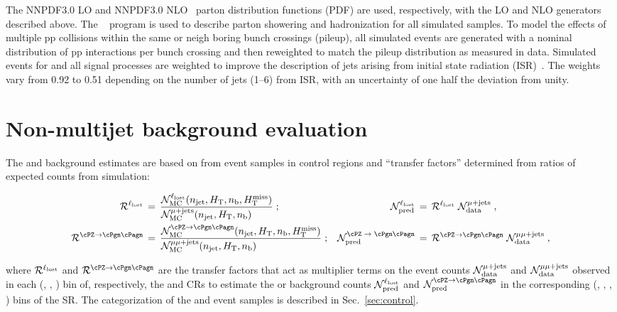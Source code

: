 The \textsc{NNPDF}3.0 LO and \textsc{NNPDF}3.0 NLO~\cite{nnpdf} parton
distribution functions (PDF) are used, respectively, with the LO and
NLO generators described above. The ~\cite{pythia} program
is used to describe parton showering and hadronization for all
simulated samples. To model the effects of multiple pp collisions
within the same or neigh boring bunch crossings (pileup), all
simulated events are generated with a nominal distribution of pp
interactions per bunch crossing and then reweighted to match the
pileup distribution as measured in data. Simulated events for \ttbar
and all signal processes are weighted to improve the description of
jets arising from initial state radiation
(ISR)~\cite{single-lepton-stop}. The weights vary from 0.92 to 0.51 
depending on the number of jets (1--6) from ISR, with an uncertainty
of one half the deviation from unity. 


\section{Non-multijet background evaluation}
\label{sec:ewk}

The \lost and \znunuj background estimates are based on from event
samples in control regions and ``transfer factors'' determined from
ratios of expected counts from simulation:

\begin{align}
  \tf^{\lost} \, & = \,
  \frac{\mathcal{N}^{\lost}_\textrm{MC}(\njet, \scalht, \nb, \mht)}
  {\mathcal{N}^{\mj}_\textrm{MC}(\njet, \scalht, \nb)\hfill} \; ;
  & 
  \mathcal{N}^{\lost}_\textrm{pred} \, & = \,
  \tf^{\lost} \; \mathcal{N}^{\mj}_\textrm{data} \; ,
  \\
  \tf^{\znunu} \, & = \,
  \frac{\mathcal{N}^{\znunu}_\textrm{MC}(\njet, \scalht, \nb, \mht)}
  {\mathcal{N}^{\mmj}_\textrm{MC}(\njet, \scalht, \nb)\hfill} \; ;
  & 
  \mathcal{N}^\textrm{\znunu}_\textrm{pred} \, & = \,
  \tf^{\znunu} \; \mathcal{N}^{\mmj}_\textrm{data} \; ,
\end{align}

where $\mathcal{R}^{\ell_\textrm{lost}}$ and $\tf^{\znunu}$ are the transfer factors that
act as multiplier terms on the event counts
$\mathcal{N}^{\mu + \text{jets}}_\textrm{data}$ and
$\mathcal{N}^{\mu\mu + \text{jets}}_\textrm{data}$ observed in each (\njet, \scalht,
\nb) bin of, respectively, the \mj and \mmj CRs to estimate the \lost
or \znunuj background counts $\mathcal{N}^{\ell_\textrm{lost}}_\textrm{pred}$ and
$\mathcal{N}^{\znunu}_\textrm{pred}$ in the corresponding (\njet,
\scalht, \nb, \mht) bins of the SR. The categorization of the \mj and
\mmj event samples is described in Sec.~\ref{sec:control}. 

